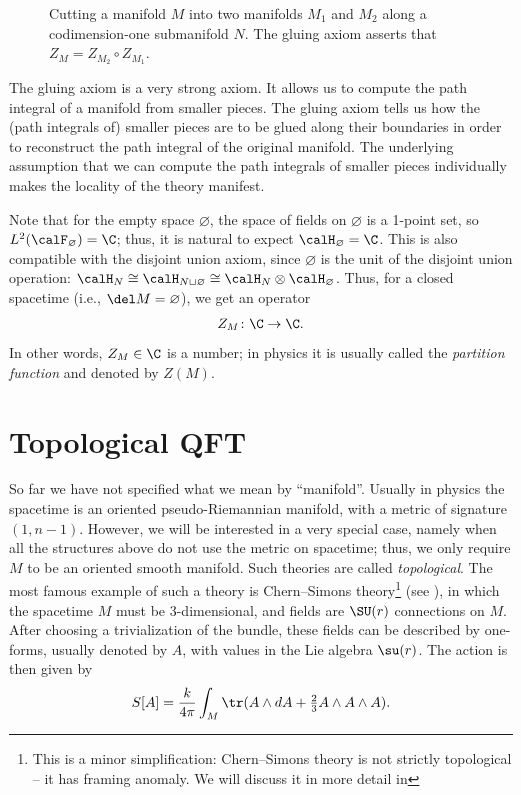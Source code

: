 \begin{enumerate}
\begin{figure}[ht]
\begin{tikzpicture}[scale=0.25]
    	\end{tikzpicture}

    	\caption{Cutting a manifold $M$ into two manifolds $M_1$ and $M_2$ along
      a codimension-one submanifold $N$. The gluing axiom asserts that
      $Z_M=Z_{M_2} \circ Z_{M_1}$.}
    	\label{f:gluing}
    \end{figure}

    The gluing axiom is a very strong axiom. It allows us to compute the path
    integral of a manifold from smaller pieces. The gluing axiom tells us how
    the (path integrals of) smaller pieces are to be glued along their
    boundaries in order to reconstruct the path integral of the original
    manifold. The underlying assumption that we can compute the path integrals
    of smaller pieces individually makes the locality of the theory manifest.
\end{enumerate}


Note that for the empty space $\varnothing$, the space of fields on
$\varnothing$ is a 1-point set, so $L^2(\calF_\varnothing)=\C$; thus, it is
natural to expect $\calH_\varnothing=\C$. This is also compatible with the
disjoint union axiom, since $\varnothing$ is the unit of the disjoint union
operation: $\calH_{N} \cong \calH_{N \sqcup \varnothing} \cong \calH_{N}\otimes
\calH_{\varnothing}$. Thus, for a closed spacetime (i.e., $\del M=\varnothing$),
we get an operator
\begin{equation}
	Z_M\colon \C\to \C.
\end{equation}
In other words, $Z_M\in \C$ is a number; in physics it is usually called the
\emph{partition function} and denoted by $Z(M)$.

\section{Topological QFT}\label{s:tqft}

So far we have not specified what we mean by ``manifold''. Usually in physics
the spacetime is an oriented pseudo-Riemannian manifold, with a metric of
signature $(1, n-1)$. However, we will be interested in a very special case,
namely when all the structures above do not use the metric on spacetime; thus,
we only require $M$ to be an oriented smooth manifold. Such theories are called
\emph{topological}. The most famous example of such a theory is Chern--Simons
theory\footnote{This is a minor simplification: Chern--Simons theory is not 
  strictly topological -- it has framing anomaly. We will discuss it in 
  more detail in } (see \cite{witten-jones}), in which the 
spacetime $M$ must be
3-dimensional, and fields are $\SU(r)$ connections on $M$. After choosing a
trivialization of the bundle, these fields can be described by one-forms,
usually denoted by $A$, with values in the Lie algebra $\su(r)$. The action is
then given by
\begin{equation}
  S[A] = \frac{k}{4 \pi} \int_M \tr(A\wedge dA + \tfrac{2}{3}A\wedge A\wedge A).
\end{equation}

